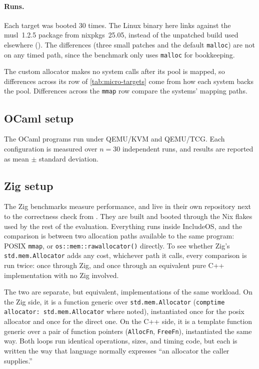 \documentclass[12pt]{report}
\newcommand{\fullref}[1]{\Cref{#1}}
\renewcommand{\_}{\origunderscore\allowbreak}
\begin{document}
\paragraph{Runs.} Each target was booted 30 times. The Linux binary here links against the musl~1.2.5 package from nixpkgs~25.05, instead of the unpatched build used elsewhere (\fullref{sec:impl-musl}). The differences (three small patches and the default \texttt{malloc}) are not on any timed path, since the benchmark only uses \texttt{malloc} for bookkeeping.

The custom allocator makes no system calls after its pool is mapped, so differences across its row of \cref{tab:micro-targets} come from how each system backs the pool. Differences across the \texttt{mmap} row compare the systems' mapping paths.

\subsection{OCaml setup}
The OCaml programs run under QEMU/KVM and QEMU/TCG. Each configuration is measured over $n = 30$ independent runs, and results are reported as mean $\pm$ standard deviation.

\subsection{Zig setup}
The Zig benchmarks measure performance, and live in their own repository next to the correctness check from \fullref{sec:eval-zig-feasibility}. They are built and booted through the Nix flakes used by the rest of the evaluation. Everything runs inside IncludeOS, and the comparison is between two allocation paths available to the same program: POSIX \texttt{mmap}, or \texttt{os::mem::raw\_allocator()} directly. To see whether Zig's \texttt{std.mem.Allocator} adds any cost, whichever path it calls, every comparison is run twice: once through Zig, and once through an equivalent pure C++ implementation with no Zig involved.

The two are separate, but equivalent, implementations of the same workload. On the Zig side, it is a function generic over \texttt{std.mem.Allocator} (\texttt{comptime allocator: std.mem.Allocator} where noted), instantiated once for the posix allocator and once for the direct one. On the C++ side, it is a template function generic over a pair of function pointers (\texttt{AllocFn}, \texttt{FreeFn}), instantiated the same way. Both loops run identical operations, sizes, and timing code, but each is written the way that language normally expresses ``an allocator the caller supplies.''
\end{document}
